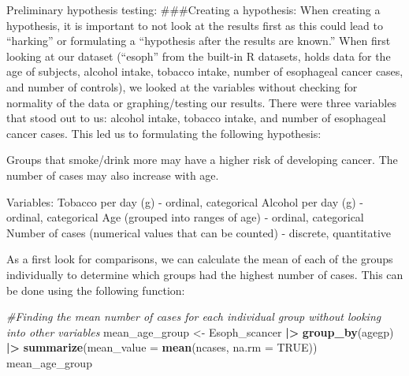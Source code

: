 \documentclass[
]{article}
\newenvironment{Shaded}{\begin{snugshade}}{\end{snugshade}}
\newcommand{\AttributeTok}[1]{\textcolor[rgb]{0.13,0.29,0.53}{#1}}
\newcommand{\CommentTok}[1]{\textcolor[rgb]{0.56,0.35,0.01}{\textit{#1}}}
\newcommand{\ConstantTok}[1]{\textcolor[rgb]{0.56,0.35,0.01}{#1}}
\newcommand{\FunctionTok}[1]{\textcolor[rgb]{0.13,0.29,0.53}{\textbf{#1}}}
\newcommand{\NormalTok}[1]{#1}
\newcommand{\OtherTok}[1]{\textcolor[rgb]{0.56,0.35,0.01}{#1}}
\newcommand{\SpecialCharTok}[1]{\textcolor[rgb]{0.81,0.36,0.00}{\textbf{#1}}}
\begin{document}
\begin{Shaded}
\end{Shaded}

Preliminary hypothesis testing: \#\#\#Creating a hypothesis: When
creating a hypothesis, it is important to not look at the results first
as this could lead to ``harking'' or formulating a ``hypothesis after
the results are known.'' When first looking at our dataset (``esoph''
from the built-in R datasets, holds data for the age of subjects,
alcohol intake, tobacco intake, number of esophageal cancer cases, and
number of controls), we looked at the variables without checking for
normality of the data or graphing/testing our results. There were three
variables that stood out to us: alcohol intake, tobacco intake, and
number of esophageal cancer cases. This led us to formulating the
following hypothesis:

Groups that smoke/drink more may have a higher risk of developing
cancer. The number of cases may also increase with age.

Variables: Tobacco per day (g) - ordinal, categorical Alcohol per day
(g) - ordinal, categorical Age (grouped into ranges of age) - ordinal,
categorical Number of cases (numerical values that can be counted) -
discrete, quantitative

As a first look for comparisons, we can calculate the mean of each of
the groups individually to determine which groups had the highest number
of cases. This can be done using the following function:

\begin{Shaded}
\begin{Highlighting}[]
\CommentTok{\#Finding the mean number of cases for each individual group without looking into other variables}
\NormalTok{mean\_age\_group }\OtherTok{\textless{}{-}}\NormalTok{ Esoph\_scancer }\SpecialCharTok{|\textgreater{}} 
  \FunctionTok{group\_by}\NormalTok{(agegp) }\SpecialCharTok{|\textgreater{}} 
  \FunctionTok{summarize}\NormalTok{(}\AttributeTok{mean\_value =} \FunctionTok{mean}\NormalTok{(ncases, }\AttributeTok{na.rm =} \ConstantTok{TRUE}\NormalTok{))}
\NormalTok{mean\_age\_group}
\end{Highlighting}
\end{Shaded}
\end{document}
